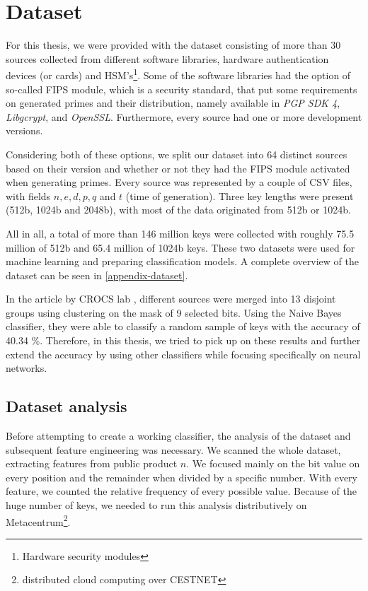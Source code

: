 \chapter{Dataset}
\label{chapter-dataset}

For this thesis, we were provided with the dataset consisting of more than 30 sources collected from different software libraries, hardware authentication devices (or cards) and HSM's\footnote{Hardware security modules}. 
Some of the software libraries had the option of so-called FIPS module, which is a security standard, that put some requirements on generated primes and their distribution, namely available in \textit{PGP SDK 4}, \textit{Libgcrypt}, and \textit{OpenSSL}. Furthermore, every source had one or more development versions. 

Considering both of these options, we split our dataset into 64 distinct sources based on their version and whether or not they had the FIPS module activated when generating primes. Every source was represented by a couple of CSV files, with fields $n, e, d, p, q$ and $t$ (time of generation). Three key lengths were present (512b, 1024b and 2048b), with most of the data originated from 512b or 1024b.

All in all, a total of more than 146 million keys were collected with roughly 75.5 million of 512b and 65.4 million of 1024b keys. These two datasets were used for machine learning and preparing classification models. A complete overview of the dataset can be seen in \autoref{appendix-dataset}.

In the article by CROCS lab \cite{svenda_1}, different sources were merged into 13 disjoint groups using clustering on the mask of 9 selected bits. Using the Naive Bayes classifier, they were able to classify a random sample of keys with the accuracy of 40.34 \%. Therefore, in this thesis, we tried to pick up on these results and further extend the accuracy by using other classifiers while focusing specifically on neural networks.

\section{Dataset analysis}

\label{chapter-analysis}

Before attempting to create a working classifier, the analysis of the dataset and subsequent feature engineering was necessary. We scanned the whole dataset, extracting features from public product $n$. We focused mainly on the bit value on every position and the remainder when divided by a specific number. With every feature, we counted the relative frequency of every possible value. Because of the huge number of keys, we needed to run this analysis distributively on Metacentrum\footnote{distributed cloud computing over CESTNET}.

